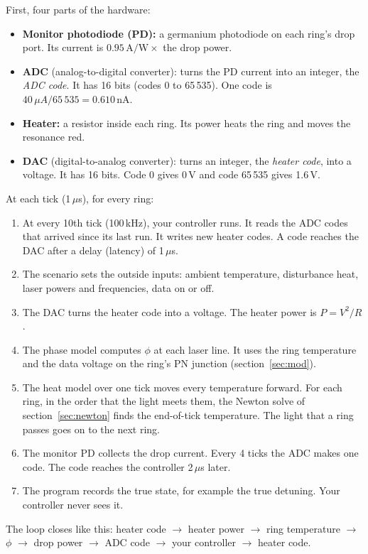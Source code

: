\documentclass[11pt,letterpaper]{article}
\newcommand{\us}{\,\ensuremath{\mu}s}
\newcommand{\uA}{\,\ensuremath{\mu}A}
\begin{document}
First, four parts of the hardware:
\begin{itemize}
  \item \textbf{Monitor photodiode (PD):} a germanium photodiode on each ring's drop port. Its current is
  $0.95\,\mathrm{A/W}\times$ the drop power.
  \item \textbf{ADC} (analog-to-digital converter): turns the PD current into an integer, the \emph{ADC code}.
  It has 16 bits (codes 0 to 65\,535). One code is $40\uA/65\,535=0.610$\,nA.
  \item \textbf{Heater:} a resistor inside each ring. Its power heats the ring and moves the resonance red.
  \item \textbf{DAC} (digital-to-analog converter): turns an integer, the \emph{heater code}, into a voltage. It has
  16 bits. Code 0 gives 0\,V and code 65\,535 gives 1.6\,V.
\end{itemize}
At each tick (1\us), for every ring:
\begin{enumerate}
  \item At every 10th tick (100\,kHz), your controller runs. It reads the ADC codes that arrived since its last
  run. It writes new heater codes. A code reaches the DAC after a delay (latency) of 1\us.
  \item The scenario sets the outside inputs: ambient temperature, disturbance heat, laser powers and frequencies,
  data on or off.
  \item The DAC turns the heater code into a voltage. The heater power is $P=V^2/R$.
  \item The phase model computes $\phi$ at each laser line. It uses the ring temperature and the data voltage on
  the ring's PN junction (section~\ref{sec:mod}).
  \item The heat model over one tick moves every temperature forward. For each ring, in the order that the light
  meets them, the Newton solve of section~\ref{sec:newton} finds the end-of-tick temperature. The light that a ring
  passes goes on to the next ring.
  \item The monitor PD collects the drop current. Every 4 ticks the ADC makes one code. The code reaches the
  controller 2\us{} later.
  \item The program records the true state, for example the true detuning. Your controller never sees it.
\end{enumerate}
The loop closes like this: heater code $\to$ heater power $\to$ ring temperature $\to$ $\phi$ $\to$ drop power
$\to$ ADC code $\to$ your controller $\to$ heater code.
\end{document}
